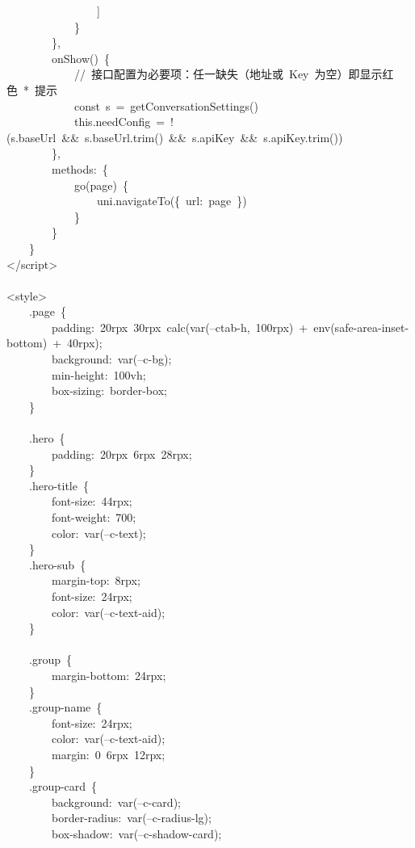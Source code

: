 \documentclass[a4paper,10pt]{article}
\begin{document}
{\ttfamily\footnotesize\raggedright
~~~~~~~~~~~~~~~~]\\
~~~~~~~~~~~~\}\\
~~~~~~~~\},\\
~~~~~~~~onShow()~\{\\
~~~~~~~~~~~~//~接口配置为必要项：任一缺失（地址或~Key~为空）即显示红色~*~提示\\
~~~~~~~~~~~~const~s~=~getConversationSettings()\\
~~~~~~~~~~~~this.needConfig~=~!(s.baseUrl~\&\&~s.baseUrl.trim()~\&\&~s.apiKey~\&\&~s.apiKey.trim())\\
~~~~~~~~\},\\
~~~~~~~~methods:~\{\\
~~~~~~~~~~~~go(page)~\{\\
~~~~~~~~~~~~~~~~uni.navigateTo(\{~url:~page~\})\\
~~~~~~~~~~~~\}\\
~~~~~~~~\}\\
~~~~\}\\
</script>\\
\mbox{}\\
<style>\\
~~~~.page~\{\\
~~~~~~~~padding:~20rpx~30rpx~calc(var(--ctab-h,~100rpx)~+~env(safe-area-inset-bottom)~+~40rpx);\\
~~~~~~~~background:~var(--c-bg);\\
~~~~~~~~min-height:~100vh;\\
~~~~~~~~box-sizing:~border-box;\\
~~~~\}\\
\mbox{}\\
~~~~.hero~\{\\
~~~~~~~~padding:~20rpx~6rpx~28rpx;\\
~~~~\}\\
~~~~.hero-title~\{\\
~~~~~~~~font-size:~44rpx;\\
~~~~~~~~font-weight:~700;\\
~~~~~~~~color:~var(--c-text);\\
~~~~\}\\
~~~~.hero-sub~\{\\
~~~~~~~~margin-top:~8rpx;\\
~~~~~~~~font-size:~24rpx;\\
~~~~~~~~color:~var(--c-text-aid);\\
~~~~\}\\
\mbox{}\\
~~~~.group~\{\\
~~~~~~~~margin-bottom:~24rpx;\\
~~~~\}\\
~~~~.group-name~\{\\
~~~~~~~~font-size:~24rpx;\\
~~~~~~~~color:~var(--c-text-aid);\\
~~~~~~~~margin:~0~6rpx~12rpx;\\
~~~~\}\\
~~~~.group-card~\{\\
~~~~~~~~background:~var(--c-card);\\
~~~~~~~~border-radius:~var(--c-radius-lg);\\
~~~~~~~~box-shadow:~var(--c-shadow-card);
}
\end{document}
